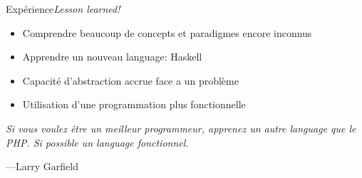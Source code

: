 \begin{frame}{Expérience}{\textit{Lesson learned!}}
    \begin{itemize}[<+->]
        \item Comprendre beaucoup de concepts et paradigmes encore inconnus
        \item Apprendre un nouveau language: Haskell
        \item Capacité d'abstraction accrue face a un problème
        \item Utilisation d'une programmation plus fonctionnelle
    \end{itemize}
\end{frame}

\begin{frame}
    \begin{flushleft}
        \textit{
            Si vous voulez être un meilleur programmeur, apprenez un autre language que
            le PHP. Si possible un language fonctionnel.
        }
        \begin{flushright}
            \tiny{---Larry Garfield}
        \end{flushright}
    \end{flushleft}

\end{frame}
